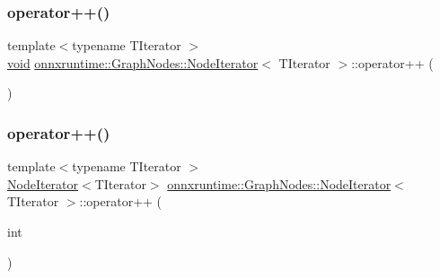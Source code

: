 \subsubsection{\texorpdfstring{operator++()}{operator++()}\hspace{0.1cm}{\footnotesize\ttfamily [1/2]}}
{\footnotesize\ttfamily template$<$typename T\+Iterator $>$ \\
\mbox{\hyperlink{mlasi_8h_a88f941d423cb2a819b70a1358982b1a6}{void}} \mbox{\hyperlink{classonnxruntime_1_1GraphNodes_1_1NodeIterator}{onnxruntime\+::\+Graph\+Nodes\+::\+Node\+Iterator}}$<$ T\+Iterator $>$\+::operator++ (\begin{DoxyParamCaption}{ }\end{DoxyParamCaption})\hspace{0.3cm}{\ttfamily [inline]}}

\mbox{\label{classonnxruntime_1_1GraphNodes_1_1NodeIterator_ae00a08e5632b7cad420182579b3df2a6}} 
\subsubsection{\texorpdfstring{operator++()}{operator++()}\hspace{0.1cm}{\footnotesize\ttfamily [2/2]}}
{\footnotesize\ttfamily template$<$typename T\+Iterator $>$ \\
\mbox{\hyperlink{classonnxruntime_1_1GraphNodes_1_1NodeIterator}{Node\+Iterator}}$<$T\+Iterator$>$ \mbox{\hyperlink{classonnxruntime_1_1GraphNodes_1_1NodeIterator}{onnxruntime\+::\+Graph\+Nodes\+::\+Node\+Iterator}}$<$ T\+Iterator $>$\+::operator++ (\begin{DoxyParamCaption}\item[{int}]{ }\end{DoxyParamCaption})\hspace{0.3cm}{\ttfamily [inline]}}

\mbox{\label{classonnxruntime_1_1GraphNodes_1_1NodeIterator_adf6975e6a3a930c724f603b16f203630}} 
